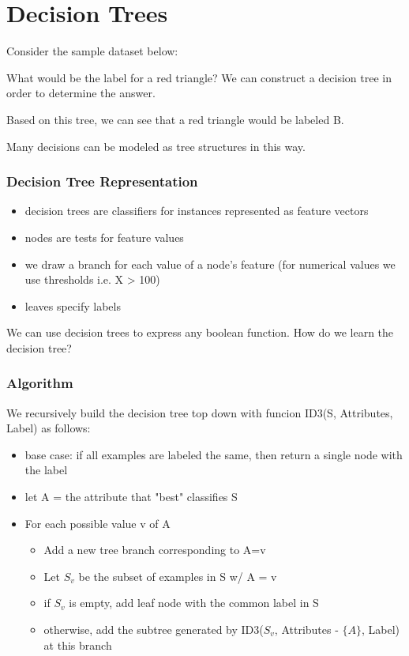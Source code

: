 \chapter*{Decision Trees}

Consider the sample dataset below: 
\begin{center}
\end{center}
What would be the label for a red triangle? We can construct a decision tree in order to determine the answer. 
\begin{center}
\end{center}
Based on this tree, we can see that a red triangle would be labeled B.

Many decisions can be modeled as tree structures in this way.

\subsection*{Decision Tree Representation}
\begin{itemize}
    \item decision trees are classifiers for instances represented as feature vectors
    \item nodes are tests for feature values 
    \item we draw a branch for each value of a node's feature (for numerical values we use thresholds i.e. X > 100)
    \item leaves specify labels
\end{itemize}

We can use decision trees to express any boolean function. How do we learn the decision tree?

\subsection*{Algorithm}
We recursively build the decision tree top down with funcion ID3(S, Attributes, Label) as follows:
\begin{itemize}
    \item base case: if all examples are labeled the same, then return a single node with the label
    \item let A = the attribute that "best" classifies S
    \item For each possible value v of A
    \begin{itemize}
        \item Add a new tree branch corresponding to A=v
        \item Let $S_v$ be the subset of examples in S w/ A = v
        \item if $S_v$ is empty, add leaf node with the common label in S
        \item otherwise, add the subtree generated by ID3($S_v$, Attributes - $\{A\}$, Label) at this branch
    \end{itemize}
\end{itemize}

